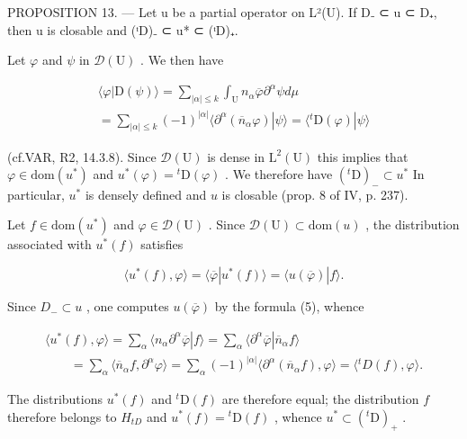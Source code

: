 PROPOSITION 13. --- Let u be a partial operator on L²(U). If D₋ ⊂ u ⊂ D₊, then u is closable and (ᵗD)₋ ⊂ u* ⊂ (ᵗD)₊.

Let \(\varphi\) and \(\psi\) in \(\mathcal{D}(\mathrm{U})\) . We then have

\[
\begin{array}{c} \langle \varphi | \mathrm{D} (\psi) \rangle = \sum_ {| \alpha | \leqslant k} \int_ {\mathrm{U}} n _ {\alpha} \overline {{\varphi}} \partial^ {\alpha} \psi d \mu \\ = \sum_ {| \alpha | \leqslant k} (- 1) ^ {| \alpha |} \langle \partial^ {\alpha} (\overline {{n}} _ {\alpha} \varphi) | \psi \rangle = \langle {} ^ {t} \mathrm{D} (\varphi) | \psi \rangle \end{array}
\]

(cf.VAR, R2, 14.3.8). Since \(\mathcal{D}(\mathrm{U})\) is dense in \(\mathrm{L}^2 (\mathrm{U})\) this implies that \(\varphi \in \mathrm{dom}(u^{*})\) and \(u^{*}(\varphi) = {}^{t}\mathrm{D}(\varphi)\) . We therefore have \(({}^{t}\mathrm{D})_{-}\subset u^{*}\) In particular, \(u^{*}\) is densely defined and \(u\) is closable (prop. 8 of IV, p. 237).

Let \(f \in \mathrm{dom}(u^{*})\) and \(\varphi \in \mathcal{D}(\mathrm{U})\) . Since \(\mathcal{D}(\mathrm{U}) \subset \mathrm{dom}(u)\) , the distribution associated with \(u^{*}(f)\) satisfies

\[
\langle u ^ {*} (f), \varphi \rangle = \langle \overline {{\varphi}} | u ^ {*} (f) \rangle = \langle u (\overline {{\varphi}}) | f \rangle .
\]

Since \(D_{-} \subset u\) , one computes \(u(\overline{\varphi})\) by the formula (5), whence

\[
\begin{array}{l} \langle u ^ {*} (f), \varphi \rangle = \sum_ {\alpha} \langle n _ {\alpha} \partial^ {\alpha} \overline {{\varphi}} | f \rangle = \sum_ {\alpha} \langle \partial^ {\alpha} \overline {{\varphi}} | \overline {{n}} _ {\alpha} f \rangle \\ \qquad = \sum_ {\alpha} \langle \overline {{n}} _ {\alpha} f, \partial^ {\alpha} \varphi \rangle = \sum_ {\alpha} (- 1) ^ {| \alpha |} \langle \partial^ {\alpha} (\overline {{n}} _ {\alpha} f), \varphi \rangle = \langle {} ^ {t} D (f), \varphi \rangle . \end{array}
\]

The distributions \(u^{*}(f)\) and \({}^{t}\mathrm{D}(f)\) are therefore equal; the distribution \(f\) therefore belongs to \(H_{tD}\) and \(u^{*}(f)={}^{t}\mathrm{D}(f)\) , whence \(u^{*}\subset({}^{t}\mathrm{D})_{+}\) .


